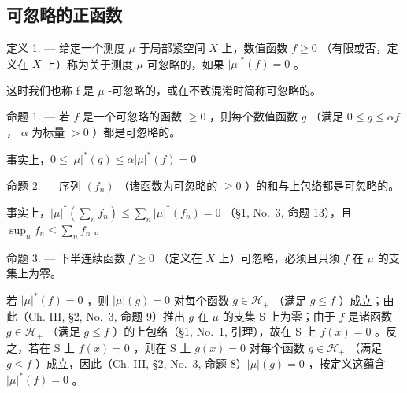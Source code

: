 \subsection{可忽略的正函数}

定义 1. --- 给定一个测度 \(\mu\) 于局部紧空间 \(X\) 上，数值函数 \(f \geqslant 0\) （有限或否，定义在 \(X\) 上）称为关于测度 \(\mu\) 可忽略的，如果 \(|\mu|^*(f) = 0\) 。

这时我们也称 f 是 \(\mu\) -可忽略的，或在不致混淆时简称可忽略的。

命题 1. --- 若 \(f\) 是一个可忽略的函数 \(\geqslant 0\) ，则每个数值函数 \(g\) （满足 \(0 \leqslant g \leqslant \alpha f\) ， \(\alpha\) 为标量 \(> 0\) ）都是可忽略的。

事实上，\(0 \leqslant |\mu|^*(g) \leqslant \alpha |\mu|^*(f) = 0\)

命题 2. --- 序列 \((f_{n})\) （诸函数为可忽略的 \(\geqslant0\) ）的和与上包络都是可忽略的。

事实上，\(|\mu|^*(\sum_n f_n) \leqslant \sum_n |\mu|^*(f_n) = 0\) （§1, No.~3, 命题 13），且 \(\sup_n f_n \leqslant \sum_n f_n\) 。

命题 3. --- 下半连续函数 \(f \geqslant 0\) （定义在 \(X\) 上）可忽略，必须且只须 \(f\) 在 \(\mu\) 的支集上为零。

若 \(|\mu|^*(f) = 0\) ，则 \(|\mu|(g) = 0\) 对每个函数 \(g \in \mathcal{H}_+\) （满足 \(g \leqslant f\) ）成立；由此（Ch. III, §2, No.~3, 命题 9）推出 \(g\) 在 \(\mu\) 的支集 S 上为零；由于 \(f\) 是诸函数 \(g \in \mathcal{H}_+\) （满足 \(g \leqslant f\) ）的上包络（§1, No.~1, 引理），故在 S 上 \(f(x) = 0\) 。反之，若在 S 上 \(f(x) = 0\) ，则在 S 上 \(g(x) = 0\) 对每个函数 \(g \in \mathcal{H}_+\) （满足 \(g \leqslant f\) ）成立，因此（Ch. III, §2, No.~3, 命题 8）\(|\mu|(g) = 0\) ，按定义这蕴含 \(|\mu|^*(f) = 0\) 。

